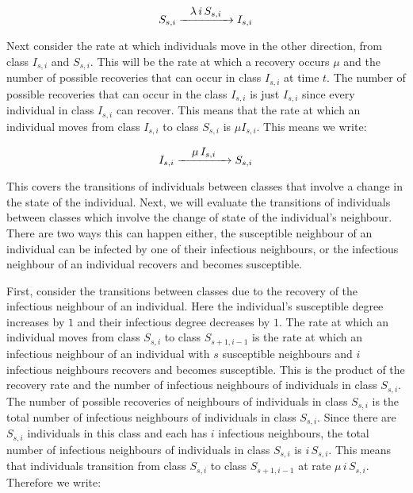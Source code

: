 \documentclass{uonmathsreport}
\begin{document}
\begin{equation}
S_{s,i}\xrightarrow{\makebox[1.5cm]{$\lambda\,i\,S_{s,i}$}}I_{s,i}
\end{equation}

Next consider the rate at which individuals move in the other direction, from class $I_{s,i}$ and $S_{s,i}$. This will be the rate at which a recovery occurs $\mu$ and the number of possible recoveries that can occur in class $I_{s,i}$ at time $t$. The number of possible recoveries that can occur in the class $I_{s,i}$ is just $I_{s,i}$ since every individual in class $I_{s,i}$ can recover. This means that the rate at which an individual moves from class $I_{s,i}$ to class $S_{s,i}$ is $\mu I_{s,i}$. This means we write:

\begin{equation}
I_{s,i}\xrightarrow{\makebox[1.5cm]{$\mu\,I_{s,i}$}}S_{s,i}
\end{equation}

This covers the transitions of individuals between classes that involve a change in the state of the individual. Next, we will evaluate the transitions of individuals between classes which involve the change of state of the individual's neighbour. There are two ways this can happen either, the susceptible neighbour of an individual can be infected by one of their infectious neighbours, or the infectious neighbour of an individual recovers and becomes susceptible.

First, consider the transitions between classes due to the recovery of the infectious neighbour of an individual. Here the individual's susceptible degree increases by $1$ and their infectious degree decreases by $1$. The rate at which an individual moves from class $S_{s,i}$ to class $S_{s+1,i-1}$ is the rate at which an infectious neighbour of an individual with $s$ susceptible neighbours and $i$ infectious neighbours recovers and becomes susceptible. This is the product of the recovery rate and the number of infectious neighbours of individuals in class $S_{s,i}$. The number of possible recoveries of neighbours of individuals in class $S_{s,i}$ is the total number of infectious neighbours of individuals in class $S_{s,i}$. Since there are $S_{s,i}$ individuals in this class and each has $i$ infectious neighbours, the total number of infectious neighbours of individuals in class $S_{s,i}$ is $i\, S_{s,i}$. This means that individuals transition from class $S_{s,i}$ to class $S_{s+1,i-1}$ at rate $\mu\, i\, S_{s,i}$. Therefore we write:
\end{document}
